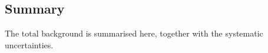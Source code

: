 \subsection{Summary}
The total background is summarised here, together with the systematic uncertainties.
